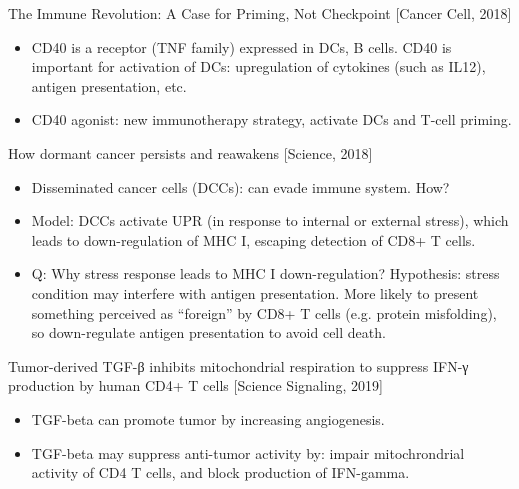 \documentclass{report}
\begin{document}
The Immune Revolution: A Case for Priming, Not Checkpoint [Cancer Cell, 2018]
\begin{itemize}
	
	\item CD40 is a receptor (TNF family) expressed in DCs, B cells. CD40 is important for activation of DCs: upregulation of cytokines (such as IL12), antigen presentation, etc. 
	
	\item CD40 agonist: new immunotherapy strategy, activate DCs and T-cell priming. 
\end{itemize}

How dormant cancer persists and reawakens [Science, 2018]
\begin{itemize}
	
	\item Disseminated cancer cells (DCCs): can evade immune system. How? 
	
	\item Model: DCCs activate UPR (in response to internal or external stress), which leads to down-regulation of MHC I, escaping detection of CD8+ T cells. 
	
	\item Q: Why stress response leads to MHC I down-regulation? Hypothesis: stress condition may interfere with antigen presentation. More likely to present something perceived as “foreign” by CD8+ T cells (e.g. protein misfolding), so down-regulate antigen presentation to avoid cell death.
\end{itemize}

Tumor-derived TGF-β inhibits mitochondrial respiration to suppress IFN-γ production by human CD4+ T cells [Science Signaling, 2019]
\begin{itemize}
	\item TGF-beta can promote tumor by increasing angiogenesis.
	
	\item TGF-beta may suppress anti-tumor activity by: impair mitochrondrial activity of CD4 T cells, and block production of IFN-gamma.
\end{itemize}
\end{document}
